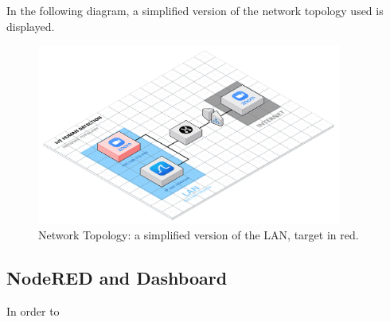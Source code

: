 \documentclass{article}
\begin{document}
In the following diagram, a simplified version of the network topology used is displayed.

\begin{figure}[h]
	\centering
	\includegraphics[width=10cm]{assets/Spy-Your-Mate-Topology.png}
	\caption{Network Topology: a simplified version of the LAN, target in red.}
\end{figure}


\subsection{NodeRED and Dashboard}

In order to 

\end{document}
